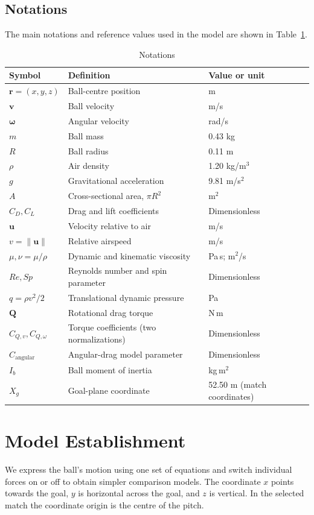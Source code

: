 \documentclass[12pt,letterpaper]{article}
\begin{document}
\subsection{Notations}
The main notations and reference values used in the model are shown in Table~\ref{tab:notations}.
\begin{table}[H]\centering\caption{Notations}\label{tab:notations}
\begin{tabular}{lll}\toprule
Symbol & Definition & Value or unit \\\midrule
$\boldsymbol r=(x,y,z)$ & Ball-centre position & m \\
$\boldsymbol v$ & Ball velocity & m/s \\
$\boldsymbol\omega$ & Angular velocity & rad/s \\
$m$ & Ball mass & 0.43 kg \\
$R$ & Ball radius & 0.11 m \\
$\rho$ & Air density & 1.20 kg/m$^3$ \\
$g$ & Gravitational acceleration & 9.81 m/s$^2$ \\
$A$ & Cross-sectional area, $\pi R^2$ & m$^2$ \\
$C_D,C_L$ & Drag and lift coefficients & Dimensionless \\
$\boldsymbol u$ & Velocity relative to air & m/s \\
$v=\|\boldsymbol u\|$ & Relative airspeed & m/s \\
$\mu,\nu=\mu/\rho$ & Dynamic and kinematic viscosity & Pa\,s; m$^2$/s \\
$Re,Sp$ & Reynolds number and spin parameter & Dimensionless \\
$q=\rho v^2/2$ & Translational dynamic pressure & Pa \\
$\boldsymbol Q$ & Rotational drag torque & N\,m \\
$C_{Q,v},C_{Q,\omega}$ & Torque coefficients (two normalizations) & Dimensionless \\
$C_{\mathrm{angular}}$ & Angular-drag model parameter & Dimensionless \\
$I_b$ & Ball moment of inertia & kg\,m$^2$ \\
$X_g$ & Goal-plane coordinate & 52.50 m (match coordinates) \\\bottomrule
\end{tabular}\end{table}

\section{Model Establishment}
We express the ball's motion using one set of equations and switch individual forces on or off to obtain simpler comparison models. The coordinate $x$ points towards the goal, $y$ is horizontal across the goal, and $z$ is vertical. In the selected match the coordinate origin is the centre of the pitch.
\end{document}
